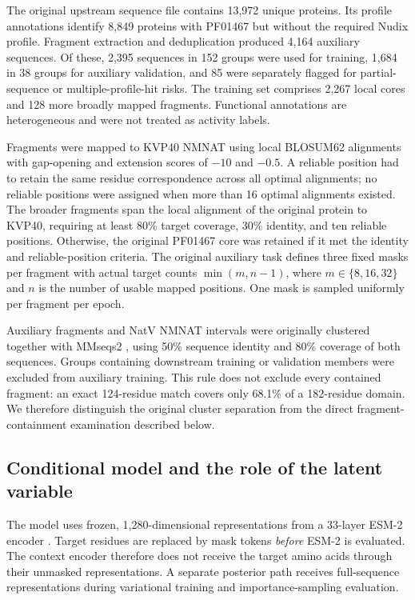 \documentclass[referee,pdflatex,sn-vancouver-num]{sn-jnl}
\begin{document}
The original upstream sequence file contains 13,972 unique proteins. Its profile annotations identify 8,849 proteins with PF01467 but without the required Nudix profile. Fragment extraction and deduplication produced 4,164 auxiliary sequences. Of these, 2,395 sequences in 152 groups were used for training, 1,684 in 38 groups for auxiliary validation, and 85 were separately flagged for partial-sequence or multiple-profile-hit risks. The training set comprises 2,267 local cores and 128 more broadly mapped fragments. Functional annotations are heterogeneous and were not treated as activity labels.

Fragments were mapped to KVP40 NMNAT using local BLOSUM62 alignments with gap-opening and extension scores of $-10$ and $-0.5$. A reliable position had to retain the same residue correspondence across all optimal alignments; no reliable positions were assigned when more than 16 optimal alignments existed. The broader fragments span the local alignment of the original protein to KVP40, requiring at least 80\% target coverage, 30\% identity, and ten reliable positions. Otherwise, the original PF01467 core was retained if it met the identity and reliable-position criteria. The original auxiliary task defines three fixed masks per fragment with actual target counts $\min(m,n-1)$, where $m\in\{8,16,32\}$ and $n$ is the number of usable mapped positions. One mask is sampled uniformly per fragment per epoch.

Auxiliary fragments and NatV NMNAT intervals were originally clustered together with MMseqs2 \cite{steinegger2017}, using 50\% sequence identity and 80\% coverage of both sequences. Groups containing downstream training or validation members were excluded from auxiliary training. This rule does not exclude every contained fragment: an exact 124-residue match covers only 68.1\% of a 182-residue domain. We therefore distinguish the original cluster separation from the direct fragment-containment examination described below.

\subsection{Conditional model and the role of the latent variable}
The model uses frozen, 1,280-dimensional representations from a 33-layer ESM-2 encoder \cite{lin2023}. Target residues are replaced by mask tokens \emph{before} ESM-2 is evaluated. The context encoder therefore does not receive the target amino acids through their unmasked representations. A separate posterior path receives full-sequence representations during variational training and importance-sampling evaluation.
\end{document}
